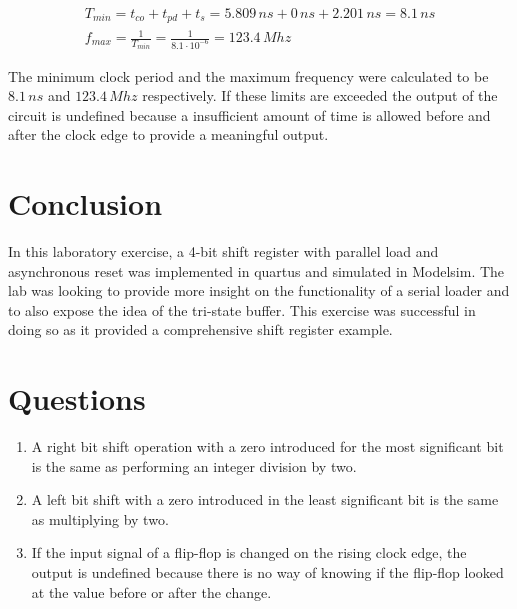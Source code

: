 \documentclass[CMPE]{KGCOEReport}
\begin{document}
\begin{align}
\label{eq:reg}
T_{min} = t_{co} + t_{pd} + t_s = 5.809\,ns + 0\,ns + 2.201\,ns = 8.1\,ns \\
f_{max} = \frac{1}{T_{min}} = \frac{1}{8.1 \cdot 10^{-6}} = 123.4\,Mhz
\end{align}

The minimum clock period and the maximum frequency were calculated to be $8.1\,ns$ and $123.4\,Mhz$ respectively. If these limits are exceeded the output of the circuit is undefined because a insufficient amount of time is allowed before and after the clock edge to provide a meaningful output.

\section*{Conclusion}

In this laboratory exercise, a 4-bit shift register with parallel load and asynchronous reset was implemented in quartus and simulated in Modelsim. The lab was looking to provide more insight on the functionality of a serial loader and to also expose the idea of the tri-state buffer. This exercise was successful in doing so as it provided a comprehensive shift register example.

\section*{Questions}

\begin{enumerate}

\item A right bit shift operation with a zero introduced for the most significant bit is the same as performing an integer division by two.

\item A left bit shift with a zero introduced in the least significant bit is the same as multiplying by two.

\item If the input signal of a flip-flop is changed on the rising clock edge, the output is undefined because there is no way of knowing if the flip-flop looked at the value before or after the change.

\end{enumerate}
\end{document}
